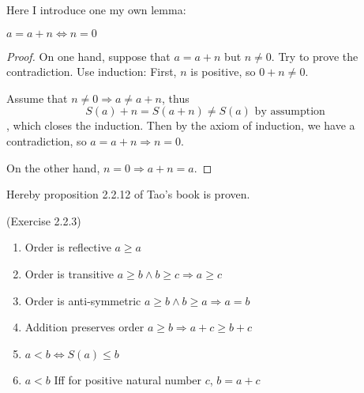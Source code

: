 Here I introduce one my own lemma:
\begin{lem}
$a=a+n \Longleftrightarrow n=0$  \label{lem3}
\end{lem}
\begin{proof}
On one hand, suppose that $a=a+n$ but $n \neq 0$. Try to prove the contradiction. Use induction:
First, $n$ is positive, so $0+n \neq 0$.

Assume that $n \neq 0 \Longrightarrow a \neq a+n$, thus 
\[
S(a)+n=S(a+n) \neq S(a) \text{ by assumption}
\], which closes the induction. Then by the axiom of induction, we have a contradiction, so 
$a=a+n \Longrightarrow n=0$.

On the other hand, $n=0 \Longrightarrow a+n=a$. \qedhere
\end{proof}

Hereby proposition 2.2.12 of Tao's book is proven.
\begin{prop}
(Exercise 2.2.3) \label{exercise2.2.3}
\begin{enumerate}
\item Order is reflective $a \geq a$
\item Order is transitive $a \geq b \wedge b \geq c \Longrightarrow a \geq c$
\item Order is anti-symmetric $a \geq b \wedge b \geq a \Longrightarrow a=b$
\item Addition preserves order $a \geq b \Longrightarrow a+c \geq b+c$
\item $a<b \Longleftrightarrow S(a) \leq b$
\item $a<b$ Iff for positive natural number $c$, $b=a+c$
\end{enumerate}
\end{prop}
